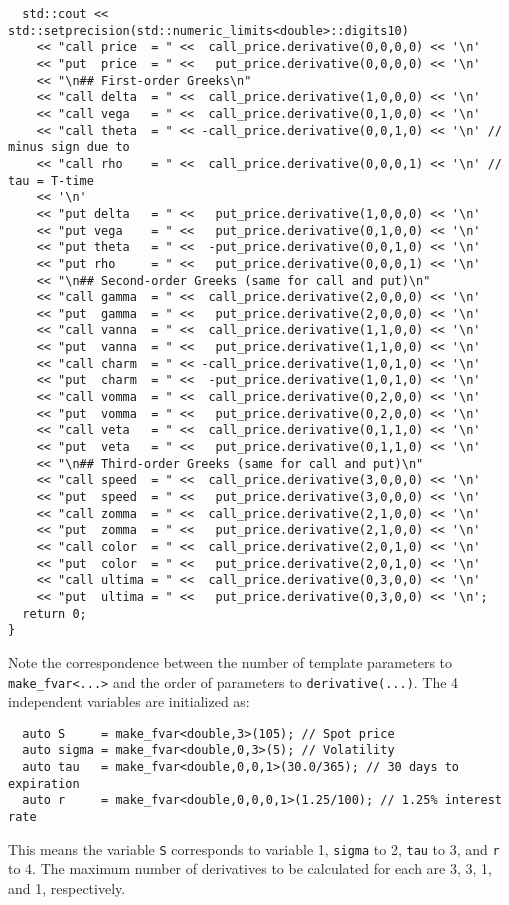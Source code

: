 \documentclass{article}
\begin{document}
\begin{verbatim}
  std::cout << std::setprecision(std::numeric_limits<double>::digits10)
    << "call price  = " <<  call_price.derivative(0,0,0,0) << '\n'
    << "put  price  = " <<   put_price.derivative(0,0,0,0) << '\n'
    << "\n## First-order Greeks\n"
    << "call delta  = " <<  call_price.derivative(1,0,0,0) << '\n'
    << "call vega   = " <<  call_price.derivative(0,1,0,0) << '\n'
    << "call theta  = " << -call_price.derivative(0,0,1,0) << '\n' // minus sign due to
    << "call rho    = " <<  call_price.derivative(0,0,0,1) << '\n' //      tau = T-time
    << '\n'
    << "put delta   = " <<   put_price.derivative(1,0,0,0) << '\n'
    << "put vega    = " <<   put_price.derivative(0,1,0,0) << '\n'
    << "put theta   = " <<  -put_price.derivative(0,0,1,0) << '\n'
    << "put rho     = " <<   put_price.derivative(0,0,0,1) << '\n'
    << "\n## Second-order Greeks (same for call and put)\n"
    << "call gamma  = " <<  call_price.derivative(2,0,0,0) << '\n'
    << "put  gamma  = " <<   put_price.derivative(2,0,0,0) << '\n'
    << "call vanna  = " <<  call_price.derivative(1,1,0,0) << '\n'
    << "put  vanna  = " <<   put_price.derivative(1,1,0,0) << '\n'
    << "call charm  = " << -call_price.derivative(1,0,1,0) << '\n'
    << "put  charm  = " <<  -put_price.derivative(1,0,1,0) << '\n'
    << "call vomma  = " <<  call_price.derivative(0,2,0,0) << '\n'
    << "put  vomma  = " <<   put_price.derivative(0,2,0,0) << '\n'
    << "call veta   = " <<  call_price.derivative(0,1,1,0) << '\n'
    << "put  veta   = " <<   put_price.derivative(0,1,1,0) << '\n'
    << "\n## Third-order Greeks (same for call and put)\n"
    << "call speed  = " <<  call_price.derivative(3,0,0,0) << '\n'
    << "put  speed  = " <<   put_price.derivative(3,0,0,0) << '\n'
    << "call zomma  = " <<  call_price.derivative(2,1,0,0) << '\n'
    << "put  zomma  = " <<   put_price.derivative(2,1,0,0) << '\n'
    << "call color  = " <<  call_price.derivative(2,0,1,0) << '\n'
    << "put  color  = " <<   put_price.derivative(2,0,1,0) << '\n'
    << "call ultima = " <<  call_price.derivative(0,3,0,0) << '\n'
    << "put  ultima = " <<   put_price.derivative(0,3,0,0) << '\n';
  return 0;
}
\end{verbatim}
\endgroup
Note the correspondence between the number of template parameters to {\tt make\_fvar<...>} and the order
of parameters to {\tt derivative(...)}. The 4 independent variables are initialized as:

\begin{verbatim}
  auto S     = make_fvar<double,3>(105); // Spot price
  auto sigma = make_fvar<double,0,3>(5); // Volatility
  auto tau   = make_fvar<double,0,0,1>(30.0/365); // 30 days to expiration
  auto r     = make_fvar<double,0,0,0,1>(1.25/100); // 1.25% interest rate
\end{verbatim}
This means the variable {\tt S} corresponds to variable 1, {\tt sigma} to 2, {\tt tau} to 3, and {\tt r} to 4.
The maximum number of derivatives to be calculated for each are 3, 3, 1, and 1, respectively.
\end{document}
